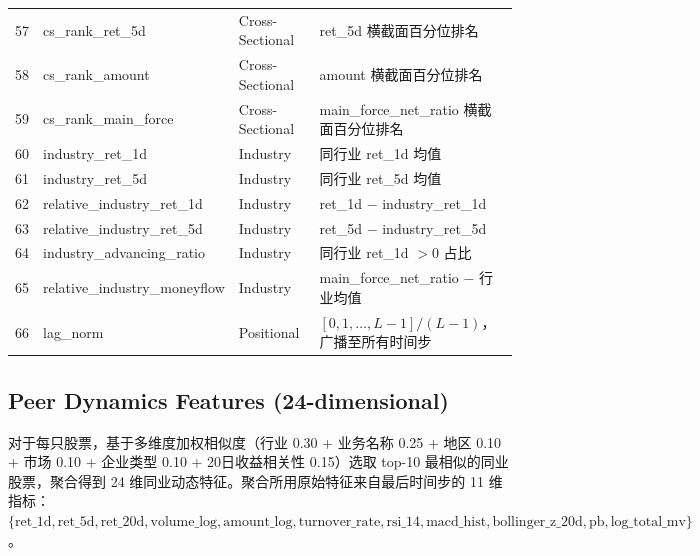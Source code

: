 {\begin{longtable}{@{}rllp{5.5cm}@{}}
57 & cs\_rank\_ret\_5d        & Cross-Sectional & ret\_5d 横截面百分位排名 \\
58 & cs\_rank\_amount         & Cross-Sectional & amount 横截面百分位排名 \\
59 & cs\_rank\_main\_force    & Cross-Sectional & main\_force\_net\_ratio 横截面百分位排名 \\
\midrule
60 & industry\_ret\_1d        & Industry & 同行业 ret\_1d 均值 \\
61 & industry\_ret\_5d        & Industry & 同行业 ret\_5d 均值 \\
62 & relative\_industry\_ret\_1d & Industry & ret\_1d $-$ industry\_ret\_1d \\
63 & relative\_industry\_ret\_5d & Industry & ret\_5d $-$ industry\_ret\_5d \\
64 & industry\_advancing\_ratio & Industry & 同行业 ret\_1d $> 0$ 占比 \\
65 & relative\_industry\_moneyflow & Industry & main\_force\_net\_ratio $-$ 行业均值 \\
\midrule
66 & lag\_norm               & Positional & $[0, 1, \dots, L-1] / (L-1)$，广播至所有时间步 \\
\bottomrule
\end{longtable}
}

\subsection{Peer Dynamics Features (24-dimensional)}

对于每只股票，基于多维度加权相似度（行业 0.30 + 业务名称 0.25 + 地区 0.10 + 市场 0.10 + 企业类型 0.10 + 20日收益相关性 0.15）选取 top-10 最相似的同业股票，聚合得到 24 维同业动态特征。聚合所用原始特征来自最后时间步的 11 维指标：$\{\text{ret\_1d}, \text{ret\_5d}, \text{ret\_20d}, \text{volume\_log}, \text{amount\_log}, \text{turnover\_rate}, \text{rsi\_14}, \text{macd\_hist}, \text{bollinger\_z\_20d}, \text{pb}, \text{log\_total\_mv}\}$。

